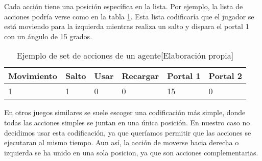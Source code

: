 Cada acción tiene una posición específica en la lista. Por ejemplo, la lista de acciones podría verse como en la tabla \ref {tab:accion}. Esta lista codificaría que el jugador se está moviendo para la izquierda mientras realiza un salto y dispara el portal 1 con un ángulo de 15 grados.

\begin{table}[h]
	\begin{center}
		\begin{tabular}{| l | l | l | l | l | l |}
			\hline
			\textbf{Movimiento} & \textbf{Salto} & \textbf{Usar} & \textbf{Recargar} & \textbf{Portal 1} & \textbf{Portal 2} \\ \hline
			1                   & 1              & 0             & 0                 & 15                & 0                 \\ \hline
		\end{tabular}
		\caption{Ejemplo de set de acciones de un agente[Elaboración propia]}
		\label{tab:accion}
	\end{center}
\end{table}


En otros juegos similares se suele escoger una codificación más simple, donde todas las acciones simples se juntan en una única posición. En nuestro caso no decidimos usar esta codificación, ya que queríamos permitir que las acciones se ejecutaran al mismo tiempo. Aun así, la acción de moverse hacia derecha o izquierda se ha unido en una sola posicion, ya que son acciones complementarias.